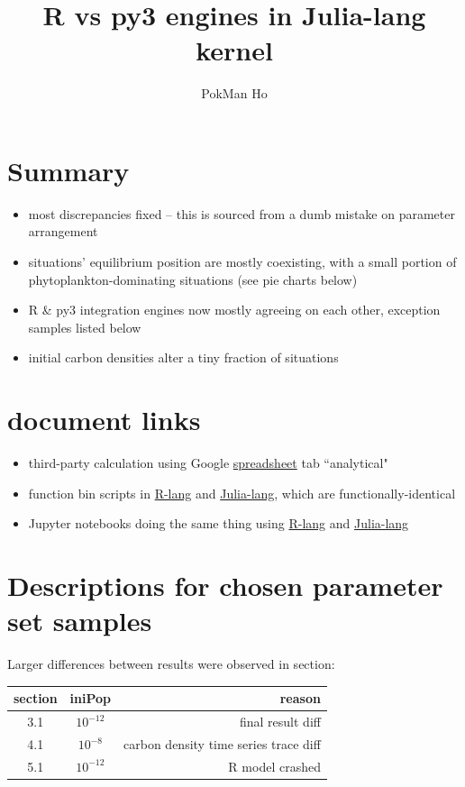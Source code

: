 \documentclass[a4paper,11pt]{article}
\title{R vs py3 engines in Julia-lang kernel}
\author{PokMan Ho}
\begin{document}
    \maketitle
    \section{Summary}
    \begin{itemize}
        \item most discrepancies fixed -- this is sourced from a dumb mistake on parameter arrangement
        \item situations' equilibrium position are mostly coexisting, with a small portion of phytoplankton-dominating situations (see pie charts below)
        \item R \& py3 integration engines now mostly agreeing on each other, exception samples listed below
        \item initial carbon densities alter a tiny fraction of situations
    \end{itemize}
    
    \section{document links}
    \begin{itemize}
        \item third-party calculation using Google  \href{https://docs.google.com/spreadsheets/d/1k4eZ2qmefPx8dAj6BVPFUE00JBayk8zqMAfbH60slB8/edit#gid=939440998}{spreadsheet} tab ``analytical"
        \item function bin scripts in \href{https://github.com/ph-u/Project/blob/master/code/func.R}{R-lang} and \href{https://github.com/ph-u/Project/blob/master/code/func.jl}{Julia-lang}, which are functionally-identical
        \item Jupyter notebooks doing the same thing using \href{https://nbviewer.jupyter.org/github/ph-u/Project/blob/master/sandbox/cpb_0514_r.ipynb}{R-lang} and \href{https://nbviewer.jupyter.org/github/ph-u/Project/blob/master/sandbox/cpb_0514_jp.ipynb}{Julia-lang}
    \end{itemize}
    
    \section{Descriptions for chosen parameter set samples}
    Larger differences between results were observed in section:
    \begin{center}
        \begin{tabular}{cc|r}\hline
            section & iniPop & reason\\\hline
            3.1 & $10^{-12}$ & final result diff\\
            4.1 & $10^{-8}$ & carbon density time series trace diff\\
            5.1 & $10^{-12}$ & R model crashed\\\hline
        \end{tabular}
    \end{center}
    
\end{document}
